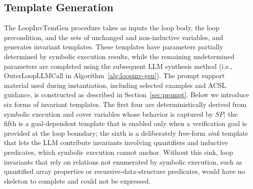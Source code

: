 \subsection{Template Generation}
\label{sec:template}

\DIFaddbegin
The $\mathrm{LoopInvTemGen}$ procedure takes as inputs the loop body, the loop precondition, and the sets of unchanged and non-inductive variables, and generates invariant templates. These templates have parameters partially determined by symbolic execution results, while the remaining undetermined parameters are completed using the subsequent LLM synthesis method (i.e., $\mathrm{OuterLoopLLMCall}$ in Algorithm~\ref{alg:loopinv-gen}). The prompt support material used during instantiation, including selected examples and ACSL guidance, is constructed as described in Section~\ref{sec:prompt}.
\DIFaddend
\DIFaddbegin
Below we introduce six forms of invariant templates. The first four are deterministically derived from symbolic execution and cover variables whose behavior is captured by $\textit{SP}$; the fifth is a goal-dependent template that is enabled only when a verification goal is provided at the loop boundary; the sixth is a deliberately free-form \emph{sink} template that lets the LLM contribute invariants involving quantifiers and inductive predicates, which symbolic execution cannot anchor.
Without this sink, loop invariants that rely on relations not enumerated by symbolic execution, such as quantified array properties or recursive‑data‑structure predicates, would have no skeleton to complete and could not be expressed.
\DIFaddend

